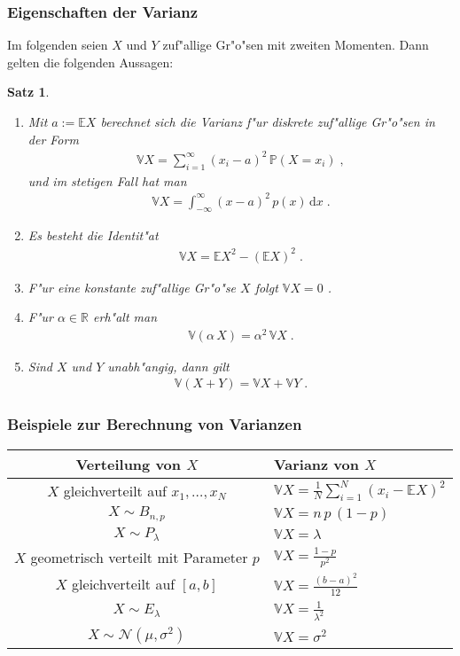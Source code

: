 \documentclass[ngerman,draft,parskip=half,twoside]{scrartcl}
\newtheorem{thm}{Satz}[section]
\newcommand*{\R}{\mathbb{R}}      %
\newcommand*{\E}{\mathbb{E}}        %
\newcommand*{\V}{\mathbb{V}}        %
\newcommand*{\WKM}{\mathbb{P}}      %
\begin{document}
\subsubsection{Eigenschaften der Varianz}
Im folgenden seien $X$ und $Y$ zuf"allige Gr"o"sen mit zweiten Momenten. Dann gelten die
folgenden Aussagen:
\begin{thm}~
\begin{enumerate}
\item
Mit $a:=\E X$ berechnet sich die Varianz f"ur diskrete zuf"allige Gr"o"sen in der Form
  \begin{gather*}
    \V X = \sum_{i=1}^\infty (x_i-a)^2\,\WKM(X=x_i)\;,
  \end{gather*}
und im stetigen Fall hat man
  \begin{gather*}
    \V X =\int_{-\infty}^\infty (x-a)^2\,p(x)\,\mathrm d x\;.
  \end{gather*}
\item
Es besteht die Identit"at
  \begin{gather*}
    \V X = \E X^2 -(\E X)^2\;.
  \end{gather*}
\item
F"ur eine konstante zuf"allige Gr"o"se $X$ folgt $\V X=0$ .
\item
F"ur $\alpha\in\R$ erh"alt man
  \begin{gather*}
    \V(\alpha\,X)=\alpha^2\,\V X\;.
  \end{gather*}
\item
Sind $X$ und $Y$ unabh"angig, dann gilt
  \begin{gather*}
    \V(X+Y)=\V X + \V Y\;.
  \end{gather*}
\end{enumerate}

\end{thm}
\subsubsection{Beispiele zur Berechnung von Varianzen}

\medskip

{\renewcommand{\arraystretch}{1.4}
\begin{center}
\begin{tabular}{|c|l|}\hline
\bf Verteilung von $X$& \bf Varianz von $X$\\ \hline\hline
$X$ gleichverteilt auf $x_1,\ldots,x_N$& $\V X=\frac{1}{N}\sum_{i=1}^N (x_i-\E X)^2$\\ \hline
$X\sim B_{n,p}$& $\V X= n\,p\,(1-p)$\\ \hline
$X\sim P_\lambda$&$\V X= \lambda$\\ \hline
$X$ geometrisch verteilt mit Parameter $p$& $\V X = \frac{1-p}{p^2}$\\ \hline
$X$ gleichverteilt auf $[a,b]$& $\V X= \frac{(b-a)^2}{12}$\\ \hline
$X\sim E_\lambda$& $\V X = \frac{1}{\lambda^2}$\\ \hline
$X\sim \mathcal N(\mu,\sigma^2)$&$ \V X = \sigma^2$\\ \hline
\end{tabular}
\end{center}
}
\end{document}
